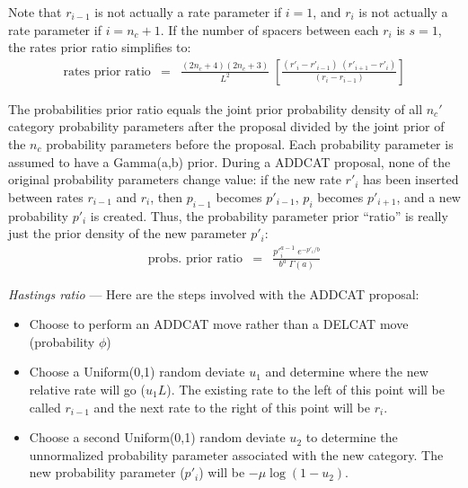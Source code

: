 \documentclass[12pt]{article}
\newcommand{\ncat}{n_c}
\newcommand{\newprobmean}{\mu}
\begin{document}
Note that $r_{i-1}$ is not actually a rate parameter if $i=1$, and $r_i$ is not actually a rate parameter if $i=\ncat+1$. If the number of spacers between each $r_i$ is $s=1$, the rates prior ratio simplifies to:
\begin{eqnarray*}
\mbox{rates prior ratio} & = & \frac{(2 \ncat + 4)(2 \ncat + 3)}{L^2} \; 
  \left[ \frac{(r'_i - r'_{i-1}) \; (r'_{i+1} - r'_i)}{(r_i - r_{i-1})} \right]
\end{eqnarray*}

The probabilities prior ratio equals the joint prior probability density of all $\ncat'$ category probability parameters after the proposal divided by the joint prior of the $\ncat$ probability parameters before the proposal. Each probability parameter is assumed to have a Gamma(a,b) prior. During a ADDCAT proposal, none of the original probability parameters change value: if the new rate $r'_i$ has been inserted between rates $r_{i-1}$ and $r_i$, then $p_{i-1}$ becomes $p'_{i-1}$, $p_i$ becomes $p'_{i+1}$, and a new probability $p'_i$ is created. Thus, the probability parameter prior ``ratio'' is really just the prior density of the new parameter $p'_i$:
\begin{eqnarray*}
\mbox{probs. prior ratio} & = & \frac{ {p'}_i^{a-1} \; e^{-p'_i/b} }{ b^a \; \Gamma(a) } 
\end{eqnarray*}

{\em Hastings ratio} --- Here are the steps involved with the ADDCAT proposal:
\begin{itemize}
\item Choose to perform an ADDCAT move rather than a DELCAT move (probability $\phi$)
\item Choose a Uniform(0,1) random deviate $u_1$ and determine where the new relative rate will go ($u_1 L$). The existing rate to the left of this point will be called $r_{i-1}$ and the next rate to the right of this point will be $r_i$.
\item Choose a second Uniform(0,1) random deviate $u_2$ to determine the unnormalized probability parameter associated with the new category. The new probability parameter ($p'_i$) will be $-\newprobmean \log(1 - u_2)$. 
\end{itemize}
\end{document}
